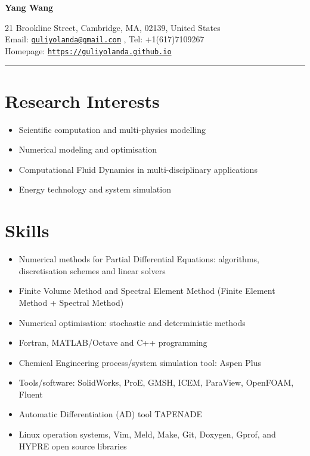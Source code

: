 \documentclass[letterpaper]{article}
\def\name{Yang Wang}
\begin{document}

\centerline{\LARGE \bf \name}


\begin{minipage}{\linewidth}
\begin{center}
21 Brookline Street, Cambridge, MA, 02139, United States\\
Email: \href{mailto:guliyolanda@gmail.com}{\tt guliyolanda@gmail.com} , Tel: +1(617)7109267 \\
Homepage:  \href{https://guliyolanda.github.io}{\tt https://guliyolanda.github.io} \\
\end{center}
\end{minipage}

\vspace{0pt}
\rule{\textwidth}{1pt}

\vspace{-12pt}
\section*{Research Interests}
\vspace{-10pt}
\begin{itemize}
\item Scientific computation and multi-physics modelling
\item Numerical modeling and optimisation
\item Computational Fluid Dynamics in multi-disciplinary applications
\item Energy technology and system simulation
\end{itemize}

\vspace{-12pt}
\section*{Skills}
\vspace{-10pt}
\begin{itemize}
\item Numerical methods for Partial Differential Equations: algorithms, discretisation schemes and linear solvers
\item Finite Volume Method and Spectral Element Method (Finite Element Method + Spectral Method)
\item Numerical optimisation: stochastic and deterministic methods
\item Fortran, MATLAB/Octave and C++ programming
\item Chemical Engineering process/system simulation tool: Aspen Plus
\item Tools/software: SolidWorks, ProE, GMSH, ICEM, ParaView, OpenFOAM, Fluent
\item Automatic Differentiation (AD) tool TAPENADE
\item Linux operation systems, Vim, Meld, Make, Git, Doxygen, Gprof, and HYPRE open source libraries
\end{itemize}
\end{document}
